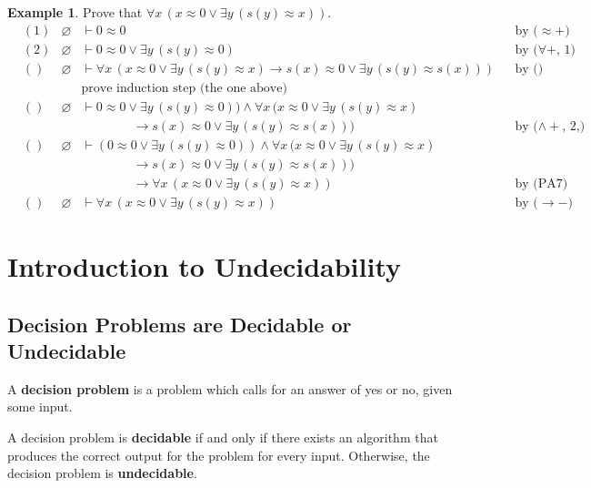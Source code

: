 \documentclass[11pt]{article}
\theoremstyle{definition}
\newtheorem{exmp}[thm]{Example}
\begin{document}
\begin{exmp}
Prove that $\forall x \, (x \approx 0 \vee \exists y \, (s(y) \approx x))$. 
\begin{align*}
    &(1) & \varnothing &\vdash 0 \approx 0 & & \text{by ($\approx+$)} \\
    &(2) & \varnothing &\vdash 0 \approx 0 \vee \exists y \, (s(y) \approx 0) & & \text{by ($\forall+$, 1)} \\
    &() & \varnothing &\vdash \forall x \, (x \approx 0 \vee \exists y \, (s(y) \approx x) \rightarrow s(x) \approx 0 \vee \exists y \, (s(y) \approx s(x))) & & \text{by ()} \\
    &&& \text{prove induction step (the one above)} \\
    &() & \varnothing &\vdash 0 \approx 0 \vee \exists y \, (s(y) \approx 0)) \wedge \forall x \, (x \approx 0 \vee \exists y \, (s(y) \approx x) \\ &&& \qquad\qquad \to s(x) \approx 0 \vee \exists y \, (s(y) \approx s(x))) & & \text{by ($\wedge+$, 2,)} \\
    &() & \varnothing &\vdash (0 \approx 0 \vee \exists y \, (s(y) \approx 0)) \wedge \forall x \, (x \approx 0 \vee \exists y \, (s(y) \approx x) \\ &&& \qquad\qquad \to s(x) \approx 0 \vee \exists y \, (s(y) \approx s(x))) \\ &&& \qquad\qquad \to \forall x \, (x \approx 0 \vee \exists y \, (s(y) \approx x)) & & \text{by (PA7)} \\
    &() & \varnothing &\vdash \forall x \, (x \approx 0 \vee \exists y \, (s(y) \approx x)) & & \text{by ($\to-$)}
\end{align*}
\end{exmp}

\newpage
\section{Introduction to Undecidability}
\subsection{Decision Problems are Decidable or Undecidable}
A {\bf decision problem} is a problem which calls for an answer of yes or no, given some input.

A decision problem is {\bf decidable} if and only if there exists an algorithm that produces the correct output for the problem for every input. Otherwise, the decision problem is {\bf undecidable}.
\end{document}
